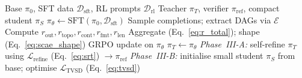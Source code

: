 \begin{algorithm}[t]
\caption{TopoPRM Training Pipeline (SFT $\to$ GRPO $\to$ TVSD)}
\label{alg:topoprm}
\begin{algorithmic}[1]
\Require Base $\pi_0$, SFT data $\mathcal{D}_{\mathrm{sft}}$, RL prompts $\mathcal{D}_{\mathrm{rl}}$
\Ensure Teacher $\pi_T$, verifier $\pi_{\mathrm{ref}}$, compact student $\pi_S$
\State $\pi_\theta \leftarrow \mathrm{SFT}(\pi_0,\mathcal{D}_{\mathrm{sft}})$ 
  \State Sample completions; extract DAGs via $\mathcal{E}$
  \State Compute $r_{\mathrm{out}},r_{\mathrm{topo}},r_{\mathrm{cont}},r_{\mathrm{fmt}},r_{\mathrm{len}}$
  \State Aggregate (Eq.~\ref{eq:r_total}); shape (Eq.~\ref{eq:scae_shape})
  \State GRPO update on $\pi_\theta$
\EndFor
\State $\pi_T \leftarrow \pi_\theta$
  \State \emph{Phase~III-A:} self-refine $\pi_T$ using $\mathcal{L}_{\mathrm{refine}}$ (Eq.~\ref{eq:srt}) $\to \pi_{\mathrm{ref}}$
  \State \emph{Phase~III-B:} initialise small student $\pi_S$ from base; optimise $\mathcal{L}_{\mathrm{TVSD}}$ (Eq.~\ref{eq:tvsd})
\EndIf
\end{algorithmic}
\end{algorithm}

